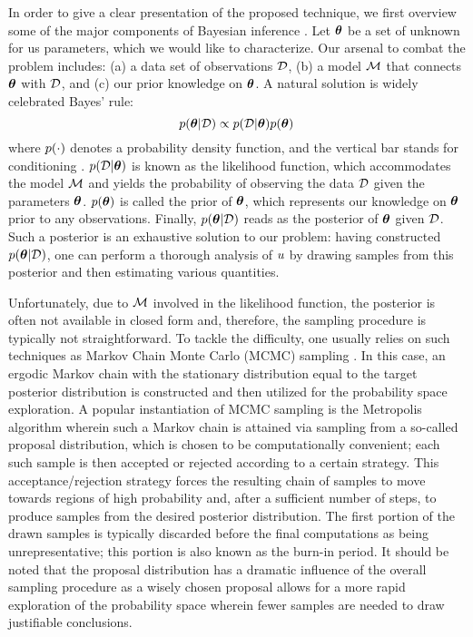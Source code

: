 In order to give a clear presentation of the proposed technique, we first overview some of the major components of Bayesian inference \cite{gelman2004}.
Let ${\boldsymbol\theta}$ be a set of unknown for us parameters, which we would like to characterize. Our arsenal to combat the problem includes: (a) a data set of observations $\mathcal{D}$, (b) a model $\model$ that connects ${\boldsymbol\theta}$ with $\mathcal{D}$, and (c) our prior knowledge on ${\boldsymbol\theta}$. A natural solution is widely celebrated Bayes' rule:
\[
  \f{\vparam | \Data} \propto \f{\Data | \vparam} \f{\vparam}
\]
where $\f{\cdot}$ denotes a probability density function, and the vertical bar stands for conditioning \cite{durrett2010}.
$\f{\Data | \vparam}$ is known as the likelihood function, which accommodates the model $\model$ and yields the probability of observing the data $\mathcal{D}$ given the parameters ${\boldsymbol\theta}$.
$\f{\vparam}$ is called the prior of ${\boldsymbol\theta}$, which represents our knowledge on ${\boldsymbol\theta}$ prior to any observations.
Finally, $\f{\vparam | \Data}$ reads as the posterior of ${\boldsymbol\theta}$ given $\mathcal{D}$. Such a posterior is an exhaustive solution to our problem: having constructed $\f{\vparam | \Data}$, one can perform a thorough analysis of $u$ by drawing samples from this posterior and then estimating various quantities.

Unfortunately, due to $\model$ involved in the likelihood function, the posterior is often not available in closed form and, therefore, the sampling procedure is typically not straightforward.
To tackle the difficulty, one usually relies on such techniques as Markov Chain Monte Carlo (MCMC) sampling \cite{gelman2004}. In this case, an ergodic Markov chain with the stationary distribution equal to the target posterior distribution is constructed and then utilized for the probability space exploration.
A popular instantiation of MCMC sampling is the Metropolis algorithm wherein such a Markov chain is attained via sampling from a so-called proposal distribution, which is chosen to be computationally convenient; each such sample is then accepted or rejected according to a certain strategy. This acceptance/rejection strategy forces the resulting chain of samples to move towards regions of high probability and, after a sufficient number of steps, to produce samples from the desired posterior distribution. The first portion of the drawn samples is typically discarded before the final computations as being unrepresentative; this portion is also known as the burn-in period. It should be noted that the proposal distribution has a dramatic influence of the overall sampling procedure as a wisely chosen proposal allows for a more rapid exploration of the probability space wherein fewer samples are needed to draw justifiable conclusions.
